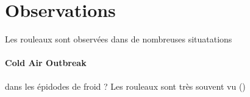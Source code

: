 \section{Observations}
Les rouleaux sont observées dans de nombreuses situatations
\paragraph{Cold Air Outbreak} dans les épidodes de froid ? Les rouleaux sont très souvent vu (\cite{brummerRollCellConvection1999})
